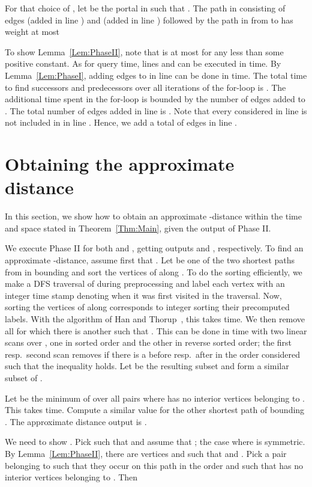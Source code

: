 \documentclass[11pt]{article}
\begin{document}
For that choice of , let  be the portal in  such that . The path in  consisting of edges  (added in line ) and  (added in line ) followed by the path in  from  to  has weight at most


To show Lemma~\ref{Lem:PhaseII}, note that  is at most  for any  less than some positive constant. As for query time, lines  and  can be executed in  time. By Lemma~\ref{Lem:PhaseI}, adding edges to  in line  can be done in  time. The total time to find successors and predecessors over all iterations of the for-loop is . The additional time spent in the for-loop is bounded by the number of edges added to . The total number of edges added in line  is . Note that every  considered in line  is not included in  in line . Hence, we add a total of  edges in line .

\section{Obtaining the approximate distance}\label{sec:ApproxDist}
In this section, we show how to obtain an approximate -distance within the time and space stated in Theorem~\ref{Thm:Main}, given the output of Phase II.

We execute Phase II for both  and , getting outputs  and , respectively. To find an approximate -distance, assume first that . Let  be one of the two shortest paths from  in  bounding  and sort the vertices of  along . To do the sorting efficiently, we make a DFS traversal of  during preprocessing and label each vertex with an integer time stamp denoting when it was first visited in the traversal. Now, sorting the vertices of  along  corresponds to integer sorting their precomputed labels. With the algorithm of Han and Thorup~\cite{IntegerSorting}, this takes  time. We then remove all  for which there is another  such that . This can be done in  time with two linear scans over , one in sorted order and the other in reverse sorted order; the first resp.~second scan removes  if there is a  before resp.~after  in the order considered such that the inequality holds. Let  be the resulting subset and form a similar subset  of .

Let  be the minimum of  over all pairs  where  has no interior vertices belonging to . This takes  time. Compute a similar value  for the other shortest path  of  bounding . The approximate distance output is .

We need to show . Pick  such that  and assume that ; the case where  is symmetric. By Lemma~\ref{Lem:PhaseII}, there are vertices  and  such that  and . Pick a pair  belonging to  such that they occur on this path in the order  and such that  has no interior vertices belonging to . Then
\end{document}
